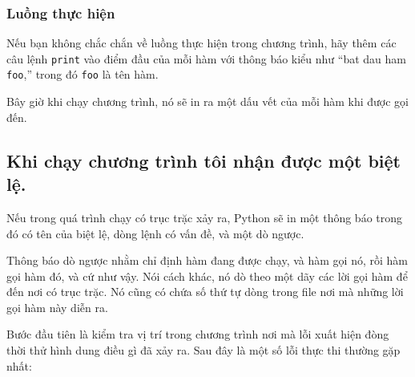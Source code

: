 \documentclass[11pt]{book}
\begin{document}
\subsubsection{Luồng thực hiện}

Nếu bạn không chắc chắn về luồng thực hiện trong chương trình, 
hãy thêm các câu lệnh {\tt print} vào điểm đầu của mỗi
hàm với thông báo kiểu như ``bat dau ham {\tt foo},'' trong đó
{\tt foo} là tên hàm.

Bây giờ khi chạy chương trình, nó sẽ in ra một dấu vết của mỗi
hàm khi được gọi đến.


\subsection{Khi chạy chương trình tôi nhận được một biệt lệ.}

Nếu trong quá trình chạy có trục trặc xảy ra, Python 
sẽ in một thông báo trong đó có tên của biệt lệ,
dòng lệnh có vấn đề, và một dò ngược.


Thông báo dò ngược nhằm chỉ định hàm đang được chạy, và hàm gọi nó,
rồi hàm gọi hàm đó, và cứ như vậy. Nói cách khác, nó dò theo một
dãy các lời gọi hàm để đến nơi có trục trặc. Nó cũng có chứa số
thứ tự dòng trong file nơi mà những lời gọi hàm này diễn ra.

Bước đầu tiên là kiểm tra vị trí trong chương trình nơi mà
lỗi xuất hiện đòng thời thử hình dung điều gì đã xảy ra.
Sau đây là một số lỗi thực thi thường gặp nhất:
\end{document}
